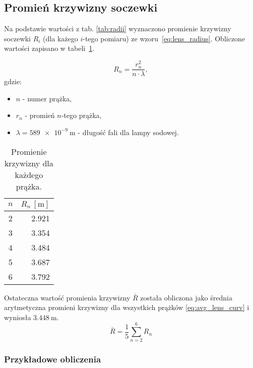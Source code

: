 \documentclass[a4paper,12pt]{article}
\begin{document}
\subsection{Promień krzywizny soczewki}

Na podstawie wartości z tab. \ref{tab:radii} wyznaczono promienie krzywizny soczewki $R_i$ (dla każego $i$-tego pomiaru) ze wzoru~\eqref{eq:lens_radius}. Obliczone wartości zapisano w tabeli~\ref{tab:radii_and_curvature}.

\begin{equation}
    \label{eq:lens_radius}
    R_n = \frac{r_n^2}{n \cdot \lambda},
\end{equation}
gdzie:
\begin{itemize}
    \item $n$ - numer prążka,
    \item $r_n$ - promień $n$-tego prążka,
    \item $\lambda = \SI{589e-9}{\meter}$ - długość fali dla lampy sodowej.
\end{itemize}

\begin{table}[H]
    \centering
    \begin{tabular}{|c|r|}
        \hline
        \textbf{$n$} & \textbf{$R_n\,[\si{\meter}]$} \\ \hline
        \num{2} & \num{2.921} \\ \hline
        \num{3} & \num{3.354} \\ \hline
        \num{4} & \num{3.484} \\ \hline
        \num{5} & \num{3.687} \\ \hline
        \num{6} & \num{3.792} \\ \hline
    \end{tabular}
    \caption{Promienie krzywizny dla każdego prążka.}
    \label{tab:radii_and_curvature}
\end{table}

Ostateczna wartość promienia krzywizny $\bar R$ została obliczona jako średnia arytmetyczna promieni krzywizny dla wszystkich prążków \eqref{eq:avg_lens_curv} i wyniosła $\SI{3.448}{\meter}$.
\begin{equation}
    \label{eq:avg_lens_curv}
    \bar R =  \frac{1}{5}\sum\limits_{n=2}^{6} R_n
\end{equation}

\subsubsection*{Przykładowe obliczenia}
\end{document}
